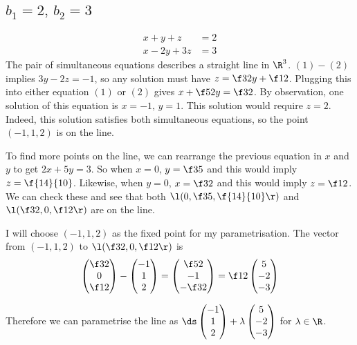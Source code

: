 \documentclass[a4paper]{article}
\begin{document}
\subsection{$b_1 = 2,\, b_2 = 3$}

\begin{align*}
x + y + z &= 2 \tag{1}\\
x - 2y + 3z &= 3 \tag{2}
\end{align*}
The pair of simultaneous equations describes a straight line in $\R^3$. $(1)-(2)$ implies $3y-2z=-1$, so any solution must have $z = \f32 y + \f12$. Plugging this into either equation $(1)$ or $(2)$ gives $x + \f52 y = \f32$. By observation, one solution of this equation is $x=-1,\, y=1$. This solution would require $z=2$. Indeed, this solution satisfies both simultaneous equations, so the point $(-1, 1, 2)$ is on the line.

To find more points on the line, we can rearrange the previous equation in $x$ and $y$ to get $2x+5y=3$. So when $x=0$, $y=\f35$ and this would imply $z=\f{14}{10}$. Likewise, when $y=0$, $x=\f32$ and this would imply $z=\f12$. We can check these and see that both $\l( 0, \f35, \f{14}{10} \r)$ and $\l( \f32, 0, \f12 \r)$ are on the line.

I will choose $(-1, 1, 2)$ as the fixed point for my parametrisation. The vector from $(-1, 1, 2)$ to $\l( \f32, 0, \f12 \r)$ is $$\begin{pmatrix}\f32\\ 0\\ \f12\end{pmatrix} - \begin{pmatrix}-1\\ 1\\ 2\end{pmatrix} = \begin{pmatrix}\f52\\ -1\\ -\f32\end{pmatrix} = \f12 \begin{pmatrix}5\\ -2\\ -3\end{pmatrix}$$

Therefore we can parametrise the line as $\ds\begin{pmatrix}-1\\ 1\\ 2\end{pmatrix} + \lambda \begin{pmatrix}5\\ -2\\ -3\end{pmatrix}$ for $\lambda \in \R$.
\end{document}
